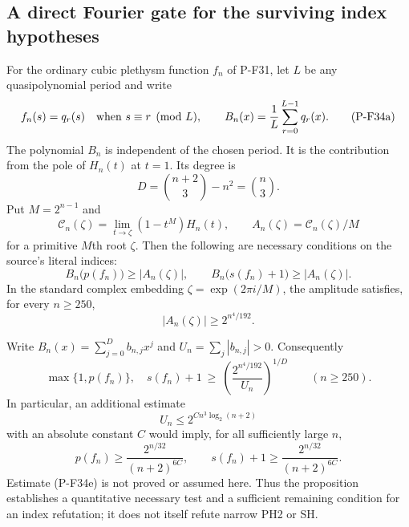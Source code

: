 \subsection{A direct Fourier gate for the surviving index hypotheses}

\begin{proposition}
\label{prop:cubicfourierindexgate}
For the ordinary cubic plethysm function $f_n$ of P-F31, let
$L$ be any quasipolynomial period and write
\[
 f_n(s)=q_r(s)\quad\hbox{when }s\equiv r\pmod L,
 \qquad
 B_n(x)=\frac1L\sum_{r=0}^{L-1}q_r(x).
 \tag{P-F34a}
\]
The polynomial $B_n$ is independent of the chosen period.
It is the contribution from the pole of $H_n(t)$ at $t=1$.
Its degree is
\[
 D=\binom{n+2}{3}-n^2=\binom n3.
\]
Put $M=2^{n-1}$ and
\[
 \mathcal C_n(\zeta)=\lim_{t\to\zeta}(1-t^M)H_n(t),
 \qquad A_n(\zeta)=\mathcal C_n(\zeta)/M
\]
for a primitive $M$th root $\zeta$. Then the following are
necessary conditions on the source's literal indices:
\[
 B_n\bigl(p(f_n)\bigr)\ge |A_n(\zeta)|,
 \qquad
 B_n\bigl(s(f_n)+1\bigr)\ge |A_n(\zeta)|.
 \tag{P-F34b}
\]
In the standard complex embedding
$\zeta=\exp(2\pi i/M)$, the amplitude satisfies, for every
$n\ge250$,
\[
                         |A_n(\zeta)|\ge2^{n^4/192}.
 \tag{P-F34c}
\]

Write $B_n(x)=\sum_{j=0}^{D}b_{n,j}x^j$ and
$U_n=\sum_j|b_{n,j}|>0$. Consequently
\[
 \max\{1,p(f_n)\},\quad s(f_n)+1
      \ \ge\ \left(\frac{2^{n^4/192}}{U_n}\right)^{1/D}
       \qquad(n\ge250).
 \tag{P-F34d}
\]
In particular, an additional estimate
\[
 U_n\le2^{C n^3\log_2(n+2)}
 \tag{P-F34e}
\]
with an absolute constant $C$ would imply, for all sufficiently
large $n$,
\[
 p(f_n)\ge\frac{2^{n/32}}{(n+2)^{6C}},\qquad
 s(f_n)+1\ge\frac{2^{n/32}}{(n+2)^{6C}}.
 \tag{P-F34f}
\]
Estimate (P-F34e) is not proved or assumed here. Thus the
proposition establishes a quantitative necessary test and
a sufficient remaining condition for an index refutation;
it does not itself refute narrow PH2 or SH.
\end{proposition}


